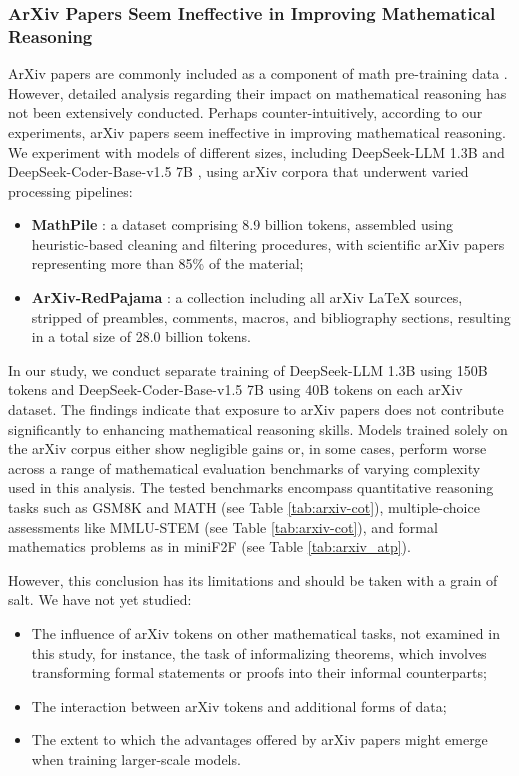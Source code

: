 \begin{itemize}[topsep=0pt]
\begin{itemize}[topsep=0pt]
\subsubsection{ArXiv Papers Seem Ineffective in Improving Mathematical Reasoning}

ArXiv papers are commonly included as a component of math pre-training data \citep{minerva,gpt-f,llemma,mathpile}. However, detailed analysis regarding their impact on mathematical reasoning has not been extensively conducted. Perhaps counter-intuitively, according to our experiments, arXiv papers seem ineffective in improving mathematical reasoning. We experiment with models of different sizes, including DeepSeek-LLM 1.3B and DeepSeek-Coder-Base-v1.5 7B \citep{deepseek-coder}, using arXiv corpora that underwent varied processing pipelines:

\begin{itemize}[topsep=0pt]
    \item \textbf{MathPile} \citep{mathpile}: a dataset comprising 8.9 billion tokens, assembled using heuristic-based cleaning and filtering procedures, with scientific arXiv papers representing more than 85\% of the material;
    \item \textbf{ArXiv-RedPajama} \citep{redpajama}: a collection including all arXiv LaTeX sources, stripped of preambles, comments, macros, and bibliography sections, resulting in a total size of 28.0 billion tokens.
\end{itemize}

In our study, we conduct separate training of DeepSeek-LLM 1.3B using 150B tokens and DeepSeek-Coder-Base-v1.5 7B using 40B tokens on each arXiv dataset. The findings indicate that exposure to arXiv papers does not contribute significantly to enhancing mathematical reasoning skills. Models trained solely on the arXiv corpus either show negligible gains or, in some cases, perform worse across a range of mathematical evaluation benchmarks of varying complexity used in this analysis. The tested benchmarks encompass quantitative reasoning tasks such as GSM8K and MATH (see Table \ref{tab:arxiv-cot}), multiple-choice assessments like MMLU-STEM (see Table \ref{tab:arxiv-cot}), and formal mathematics problems as in miniF2F (see Table \ref{tab:arxiv_atp}).

However, this conclusion has its limitations and should be taken with a grain of salt. We have not yet studied:

\begin{itemize}[topsep=0pt]
    \item The influence of arXiv tokens on other mathematical tasks, not examined in this study, for instance, the task of informalizing theorems, which involves transforming formal statements or proofs into their informal counterparts;
    \item The interaction between arXiv tokens and additional forms of data;
    \item The extent to which the advantages offered by arXiv papers might emerge when training larger-scale models.
\end{itemize}


\end{itemize}
\end{itemize}
